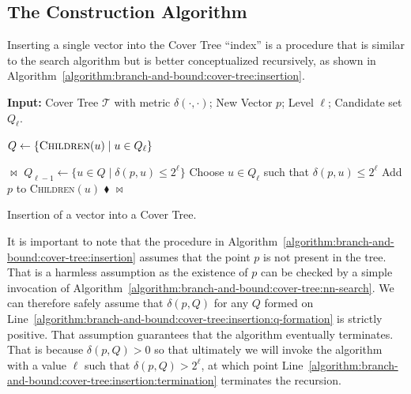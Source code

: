 \subsection{The Construction Algorithm}
Inserting a single vector into the Cover Tree ``index'' is a procedure
that is similar to the search algorithm but is better conceptualized recursively,
as shown in Algorithm~\ref{algorithm:branch-and-bound:cover-tree:insertion}.

\begin{algorithm}[!t]
\SetAlgoLined
{\bf Input:}{ Cover Tree $\mathcal{T}$ with metric $\delta(\cdot, \cdot)$; New Vector $p$;
Level $\ell$; Candidate set $Q_\ell$.}\\

\begin{algorithmic}[1]

\STATE $Q \leftarrow \{ \textsc{Children}(u) \;|\; u \in Q_\ell \}$ \label{algorithm:branch-and-bound:cover-tree:insertion:q-formation}

 \label{algorithm:branch-and-bound:cover-tree:insertion:termination}
    \RETURN $\bowtie$
\ELSE
    \STATE $Q_{\ell - 1} \leftarrow \{ u \in Q \;|\; \delta(p, u) \leq 2^\ell \}$ \label{algorithm:branch-and-bound:cover-tree:insertion:pruning}
     \label{algorithm:branch-and-bound:cover-tree:insertion:success}
        \STATE Choose $u \in Q_\ell$ such that $\delta(p, u) \leq 2 ^\ell$
        \STATE Add $p$ to \textsc{Children}$(u)$
        \RETURN $\blacklozenge$
    \ELSE
        \RETURN $\bowtie$
    \ENDIF
\ENDIF

\end{algorithmic}
\caption{Insertion of a vector into a Cover Tree.}
\label{algorithm:branch-and-bound:cover-tree:insertion}
\end{algorithm}

It is important to note that the procedure in
Algorithm~\ref{algorithm:branch-and-bound:cover-tree:insertion} assumes
that the point $p$ is not present in the tree. That is a harmless assumption
as the existence of $p$ can be checked by a simple invocation of
Algorithm~\ref{algorithm:branch-and-bound:cover-tree:nn-search}. We can therefore
safely assume that $\delta(p, Q)$ for any $Q$ formed on
Line~\ref{algorithm:branch-and-bound:cover-tree:insertion:q-formation} is strictly positive.
That assumption guarantees that the algorithm eventually terminates.
That is because $\delta(p, Q) > 0$ so that ultimately we will invoke the algorithm
with a value $\ell$ such that $\delta(p, Q) > 2^\ell$, at which point
Line~\ref{algorithm:branch-and-bound:cover-tree:insertion:termination} terminates
the recursion.

